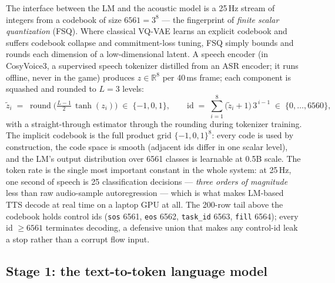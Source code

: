 \documentclass[11pt,a4paper]{article}
\newcommand{\R}{\mathbb{R}}
\newcommand{\code}[1]{\texttt{#1}}
\begin{document}
The interface between the LM and the acoustic model is a 25\,Hz stream of integers from
a codebook of size $6561 = 3^8$ --- the fingerprint of \emph{finite scalar quantization}
(FSQ). Where classical VQ-VAE learns an explicit codebook and suffers codebook collapse
and commitment-loss tuning, FSQ simply bounds and rounds each dimension of a low-dimensional
latent. A speech encoder (in CosyVoice3, a supervised speech tokenizer distilled from an
ASR encoder; it runs offline, never in the game) produces $z \in \R^{8}$ per 40\,ms
frame; each component is squashed and rounded to $L = 3$ levels:
\begin{equation}
\tilde z_i \;=\; \operatorname{round}\!\big( \tfrac{L-1}{2}\,\tanh(z_i) \big)
\;\in\; \{-1, 0, 1\},
\qquad
\mathrm{id} \;=\; \sum_{i=1}^{8} \big(\tilde z_i + 1\big)\, 3^{\,i-1}
\;\in\; \{0, \dots, 6560\},
\label{eq:fsq}
\end{equation}
with a straight-through estimator through the rounding during tokenizer training. The
implicit codebook is the full product grid $\{-1,0,1\}^8$: every code is used by
construction, the code space is smooth (adjacent ids differ in one scalar level), and
the LM's output distribution over 6561 classes is learnable at 0.5B scale. The token
rate is the single most important constant in the whole system: at 25\,Hz, one second of
speech is 25 classification decisions --- \emph{three orders of magnitude} less than raw
audio-sample autoregression --- which is what makes LM-based TTS decode at real time on a
laptop GPU at all. The 200-row tail above the codebook holds control ids
(\code{sos} 6561, \code{eos} 6562, \code{task\_id} 6563, \code{fill} 6564); every id
$\ge 6561$ terminates decoding, a defensive union that makes any control-id leak a stop
rather than a corrupt flow input.

\subsection{Stage 1: the text-to-token language model}
\label{sec:cosy-lm}
\end{document}
